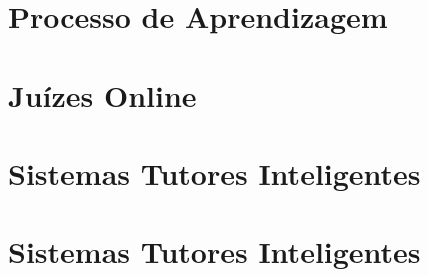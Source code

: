 

    
  \section{Processo de Aprendizagem}



  \section{Juízes Online}


  \section{Sistemas Tutores Inteligentes}

  
  \section{Sistemas Tutores Inteligentes}